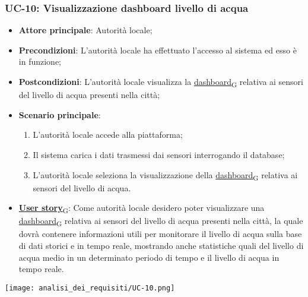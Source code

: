 \subsubsection{UC-10: Visualizzazione dashboard livello di acqua}
\begin{itemize}
	\item \textbf{Attore principale}: Autorità locale;
	\item \textbf{Precondizioni}: L'autorità locale ha effettuato l'accesso al sistema ed esso è in funzione;
	\item \textbf{Postcondizioni}: L'autorità locale visualizza la \href{https://7last.github.io/docs/rtb/documentazione-interna/glossario\#dashboard}{dashboard\textsubscript{G}} relativa
	      ai sensori del livello di acqua presenti nella città;
	\item \textbf{Scenario principale}:
	      \begin{enumerate}
		      \item L'autorità locale accede alla piattaforma;
		      \item Il sistema carica i dati trasmessi dai sensori interrogando il database;
		      \item L'autorità locale seleziona la visualizzazione della \href{https://7last.github.io/docs/rtb/documentazione-interna/glossario\#dashboard}{dashboard\textsubscript{G}} relativa ai sensori del livello di acqua.
	      \end{enumerate}
	\item \href{https://7last.github.io/docs/rtb/documentazione-interna/glossario\#user-story}{\textbf{User story}\textsubscript{G}}:
	      Come autorità locale desidero poter visualizzare una \href{https://7last.github.io/docs/rtb/documentazione-interna/glossario\#dashboard}{dashboard\textsubscript{G}} relativa ai sensori del livello di acqua presenti nella città, la quale
	      dovrà contenere informazioni utili per monitorare il livello di acqua sulla base di dati storici e in tempo reale, mostrando
	      anche statistiche quali del livello di acqua medio in un determinato periodo di tempo e il livello di acqua in tempo reale.
\end{itemize}
\begin{center}
	\texttt{[image: analisi\_dei\_requisiti/UC-10.png]}
\end{center}

